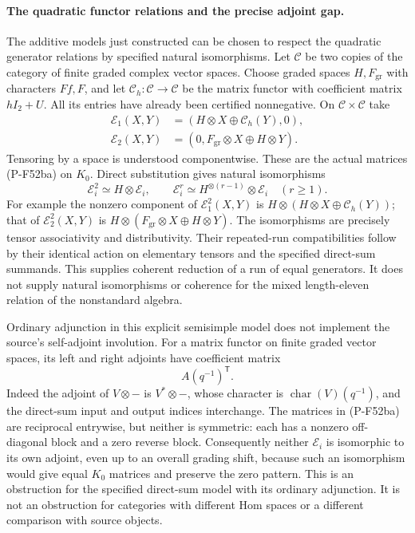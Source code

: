 \paragraph{The quadratic functor relations and the precise adjoint gap.}
The additive models just constructed can be chosen to respect
the quadratic generator relations by specified natural
isomorphisms. Let $\mathscr C$ be two copies of the category
of finite graded complex vector spaces. Choose graded spaces
$H,F_{\mathrm{gr}}$ with characters $Ff,F$, and let
$\mathscr C_h:\mathscr C\to\mathscr C$ be the matrix
functor with coefficient matrix $hI_2+U$. All its entries
have already been certified nonnegative. On
$\mathscr C\times\mathscr C$ take
\[
 \begin{split}
 \mathscr E_1(X,Y)&=(H\otimes X\oplus\mathscr C_h(Y),0),\\
 \mathscr E_2(X,Y)&=(0,F_{\mathrm{gr}}\otimes X\oplus H\otimes Y).
 \end{split}                                                    \tag{P-F52bd}
\]
Tensoring by a space is understood componentwise. These are
the actual matrices (P-F52ba) on $K_0$. Direct substitution
gives natural isomorphisms
\[
       \mathscr E_i^2\simeq H\otimes\mathscr E_i,
       \qquad
       \mathscr E_i^r\simeq
                     H^{\otimes(r-1)}\otimes\mathscr E_i
                     \quad(r\ge1).
                                                               \tag{P-F52be}
\]
For example the nonzero component of $\mathscr E_1^2(X,Y)$
is $H\otimes(H\otimes X\oplus\mathscr C_h(Y))$;
that of $\mathscr E_2^2(X,Y)$ is
$H\otimes(F_{\mathrm{gr}}\otimes X\oplus H\otimes Y)$.
The isomorphisms are precisely tensor associativity and
distributivity. Their repeated-run compatibilities follow
by their identical action on elementary tensors and the
specified direct-sum summands. This supplies coherent
reduction of a run of equal generators. It does not supply
natural isomorphisms or coherence for the mixed
length-eleven relation of the nonstandard algebra.

Ordinary adjunction in this explicit semisimple model does
not implement the source's self-adjoint involution.
For a matrix functor on finite graded vector spaces, its
left and right adjoints have coefficient matrix
\[
                         A(q^{-1})^{\mathsf T}.
                                                               \tag{P-F52bf}
\]
Indeed the adjoint of $V\otimes-$ is $V^*\otimes-$,
whose character is $\operatorname{char}(V)(q^{-1})$,
and the direct-sum input and output indices interchange.
The matrices in (P-F52ba) are reciprocal entrywise, but
neither is symmetric: each has a nonzero off-diagonal
block and a zero reverse block. Consequently neither
$\mathscr E_i$ is isomorphic to its own adjoint, even
up to an overall grading shift, because such an
isomorphism would give equal $K_0$ matrices and preserve
the zero pattern. This is an obstruction for the
specified direct-sum model with its ordinary adjunction.
It is not an obstruction for categories with different
Hom spaces or a different comparison with source objects.

